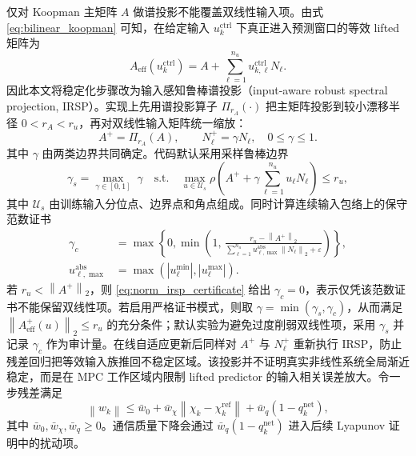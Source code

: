 \documentclass[twocolumn,3p,times,procedia]{elsarticle}
\newcommand{\norm}[1]{\left\lVert #1 \right\rVert}
\begin{document}
仅对 Koopman 主矩阵 $A$ 做谱投影不能覆盖双线性输入项。由式 \eqref{eq:bilinear_koopman} 可知，在给定输入 $u_k^{\mathrm{ctrl}}$ 下真正进入预测窗口的等效 lifted 矩阵为
\begin{equation}
A_{\mathrm{eff}}(u_k^{\mathrm{ctrl}})=A+\sum_{\ell=1}^{n_u}u_{k,\ell}^{\mathrm{ctrl}}N_\ell .
\label{eq:effective_bilinear_matrix}
\end{equation}
因此本文将稳定化步骤改为输入感知鲁棒谱投影（input-aware robust spectral projection, IRSP）。实现上先用谱投影算子 $\Pi_{r_A}(\cdot)$ 把主矩阵投影到较小漂移半径 $0<r_A<r_u$，再对双线性输入矩阵统一缩放：
\begin{equation}
A^+=\Pi_{r_A}(A),\qquad N_\ell^+=\gamma N_\ell,\quad 0\le\gamma\le 1 .
\label{eq:irsp_projection}
\end{equation}
其中 $\gamma$ 由两类边界共同确定。代码默认采用采样鲁棒边界
\begin{equation}
\gamma_s=\max_{\gamma\in[0,1]}\;\gamma
\quad \mathrm{s.t.}\quad
\max_{u\in\mathcal U_s}
\rho\!\left(A^++\gamma\sum_{\ell=1}^{n_u}u_\ell N_\ell\right)
\le r_u ,
\label{eq:sampled_irsp}
\end{equation}
其中 $\mathcal U_s$ 由训练输入分位点、边界点和角点组成。同时计算连续输入包络上的保守范数证书
\begin{equation}
\begin{aligned}
\gamma_c&=\max\left\{0,\min\left(1,\,
\frac{r_u-\norm{A^+}_2}{\sum_{\ell=1}^{n_u}u_{\ell,\max}^{\mathrm{abs}}\norm{N_\ell}_2+\varepsilon}
\right)\right\},\\
u_{\ell,\max}^{\mathrm{abs}}&=\max(|u_\ell^{\min}|,|u_\ell^{\max}|).
\end{aligned}
\label{eq:norm_irsp_certificate}
\end{equation}
若 $r_u<\norm{A^+}_2$，则 \eqref{eq:norm_irsp_certificate} 给出 $\gamma_c=0$，表示仅凭该范数证书不能保留双线性项。若启用严格证书模式，则取 $\gamma=\min(\gamma_s,\gamma_c)$，从而满足 $\norm{A_{\mathrm{eff}}^+(u)}_2\le r_u$ 的充分条件；默认实验为避免过度削弱双线性项，采用 $\gamma_s$ 并记录 $\gamma_c$ 作为审计量。在线自适应更新后同样对 $A^+$ 与 $N_\ell^+$ 重新执行 IRSP，防止残差回归把等效输入族推回不稳定区域。该投影并不证明真实非线性系统全局渐近稳定，而是在 MPC 工作区域内限制 lifted predictor 的输入相关误差放大。令一步残差满足
\begin{equation}
\norm{w_k}\le \bar w_0+\bar w_\chi\norm{\chi_k-\chi_k^\mathrm{ref}}+\bar w_q(1-q_k^{\mathrm{net}}),
\label{eq:residual_bound}
\end{equation}
其中 $\bar w_0,\bar w_\chi,\bar w_q\ge0$。通信质量下降会通过 $\bar w_q(1-q_k^{\mathrm{net}})$ 进入后续 Lyapunov 证明中的扰动项。
\end{document}
